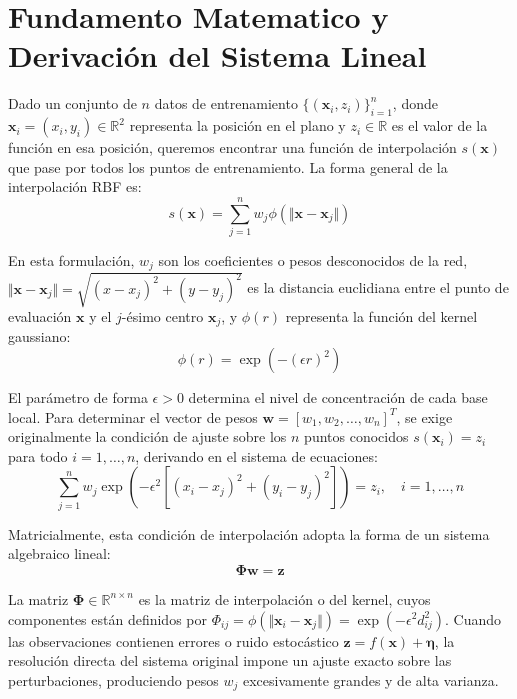 \documentclass[12pt]{article}
\begin{document}
    \section{Fundamento Matematico y Derivación del Sistema Lineal}
        Dado un conjunto de $n$ datos de entrenamiento $\{(\mathbf{x}_i, z_i)\}_{i=1}^{n}$, donde $\mathbf{x}_i = (x_i, y_i) \in \mathbb{R}^2$ representa la posición en el plano y $z_i \in \mathbb{R}$ es el valor de la función en esa posición, queremos encontrar una función de interpolación $s(\mathbf{x})$ que pase por todos los puntos de entrenamiento. La forma general de la interpolación RBF es:
        \begin{equation}
            s(\mathbf{x}) = \sum_{j=1}^{n} w_j \phi\left(\Vert{}\mathbf{x} - \mathbf{x}_j\Vert{}\right)
        \end{equation}

        En esta formulación, $w_j$ son los coeficientes o pesos desconocidos de la red, $\Vert{}\mathbf{x} - \mathbf{x}_j\Vert{} = \sqrt{(x - x_j)^2 + (y - y_j)^2}$ es la distancia euclidiana entre el punto de evaluación $\mathbf{x}$ y el $j$-ésimo centro $\mathbf{x}_j$, y $\phi(r)$ representa la función del kernel gaussiano:
        \begin{equation}
            \phi(r) = \exp\left(-(\epsilon r)^2\right)
        \end{equation}

        El parámetro de forma $\epsilon > 0$ determina el nivel de concentración de cada base local. Para determinar el vector de pesos $\mathbf{w} = [w_1, w_2, \dots, w_n]^T$, se exige originalmente la condición de ajuste sobre los $n$ puntos conocidos $s(\mathbf{x}_i) = z_i$ para todo $i = 1, \dots, n$, derivando en el sistema de ecuaciones:
        \begin{equation}
            \sum_{j=1}^{n} w_j \exp\left(-\epsilon^2 \left[(x_i - x_j)^2 + (y_i - y_j)^2\right]\right) = z_i, \quad i=1,\dots,n
        \end{equation}

        Matricialmente, esta condición de interpolación adopta la forma de un sistema algebraico lineal:
        \begin{equation}
            \mathbf{\Phi} \mathbf{w} = \mathbf{z}
        \end{equation}

        La matriz $\mathbf{\Phi} \in \mathbb{R}^{n \times n}$ es la matriz de interpolación o del kernel, cuyos componentes están definidos por $\Phi_{ij} = \phi(\Vert{}\mathbf{x}_i - \mathbf{x}_j\Vert{}) = \exp\left(-\epsilon^2 d_{ij}^2\right)$. Cuando las observaciones contienen errores o ruido estocástico $\mathbf{z} = f(\mathbf{x}) + \boldsymbol{\eta}$, la resolución directa del sistema original impone un ajuste exacto sobre las perturbaciones, produciendo pesos $w_j$ excesivamente grandes y de alta varianza.
\end{document}
